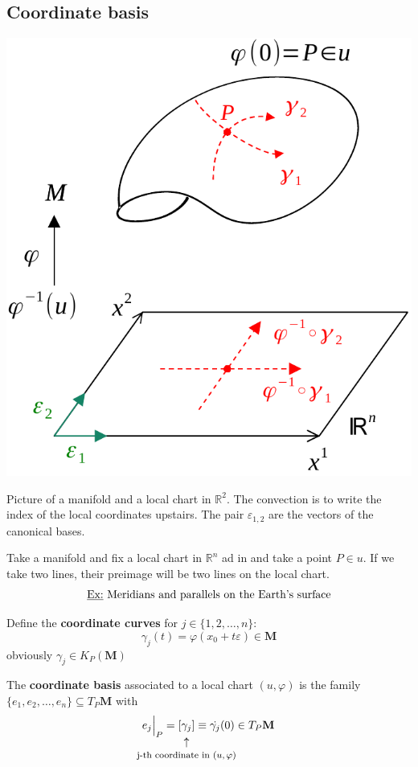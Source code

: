 \documentclass[../main.tex]{subfiles}
\begin{document}
\subsection{Coordinate basis}
\begin{marginfigure}
	\includegraphics[width=1.3\linewidth]{images/coord_basis.pdf}
	\caption[Coordinate bases]{Picture of a manifold and a local chart in $\mathbb{R}^2$. The convection is to write the index of the local coordinates upstairs. The pair $\varepsilon_{1,2}$ are the vectors of the canonical bases.}
\end{marginfigure} 
Take a manifold and fix a local chart in $\mathbb{R}^n$ ad in  and take a point $P\in u$. If we take two lines, their preimage will be two lines on the local chart. 
\[
\textrm{\underline{Ex:} Meridians and parallels on the Earth's surface}
\]
\begin{definition}
Define the \textbf{coordinate curves} for $j \in \{1,2,\dots,n\}$:
\[
\gamma_j(t)=\varphi(x_0+t\varepsilon)\in\mathbf{M}
\]
obviously \(\gamma_j\in K_P(\mathbf{M})\)
\end{definition}
\begin{definition}
The \textbf{coordinate basis} associated to a local chart $(u,\varphi)$ is the family $\{e_1,e_2,\dots,e_n\}\subseteq T_P\mathbf{M}$ with\
\[
e_j\Bigr|_{\substack{P}}=[\underset{\mathclap{\tikz \node {$\uparrow$} node [below=1ex] {\footnotesize j-th coordinate in $(u,\varphi)$};}}{\gamma_j}]\equiv\Dot{\gamma_j}(0)\in T_P \mathbf{M}
\]
\end{definition}
\end{document}
